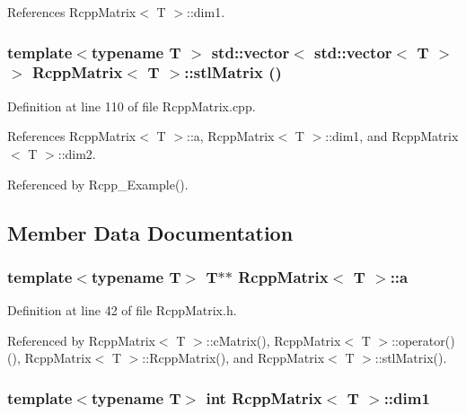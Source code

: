 References RcppMatrix$<$ T $>$::dim1.\hypertarget{classRcppMatrix_ae74547edb5d989adb87b2e483153de89}{
\subsubsection[{stlMatrix}]{\setlength{\rightskip}{0pt plus 5cm}template$<$typename T $>$ std::vector$<$ std::vector$<$ T $>$ $>$ {\bf RcppMatrix}$<$ T $>$::stlMatrix ()}}
\label{classRcppMatrix_ae74547edb5d989adb87b2e483153de89}


Definition at line 110 of file RcppMatrix.cpp.

References RcppMatrix$<$ T $>$::a, RcppMatrix$<$ T $>$::dim1, and RcppMatrix$<$ T $>$::dim2.

Referenced by Rcpp\_\-Example().

\subsection{Member Data Documentation}
\hypertarget{classRcppMatrix_a3f4dad8e2aed525c9b20e98d262ec31e}{
\subsubsection[{a}]{\setlength{\rightskip}{0pt plus 5cm}template$<$typename T$>$ T$\ast$$\ast$ {\bf RcppMatrix}$<$ T $>$::{\bf a}}}
\label{classRcppMatrix_a3f4dad8e2aed525c9b20e98d262ec31e}


Definition at line 42 of file RcppMatrix.h.

Referenced by RcppMatrix$<$ T $>$::cMatrix(), RcppMatrix$<$ T $>$::operator()(), RcppMatrix$<$ T $>$::RcppMatrix(), and RcppMatrix$<$ T $>$::stlMatrix().\hypertarget{classRcppMatrix_a3b2f3ef7c2b482e4f7e7f4f96b787128}{
\subsubsection[{dim1}]{\setlength{\rightskip}{0pt plus 5cm}template$<$typename T$>$ int {\bf RcppMatrix}$<$ T $>$::{\bf dim1}}}
\label{classRcppMatrix_a3b2f3ef7c2b482e4f7e7f4f96b787128}


